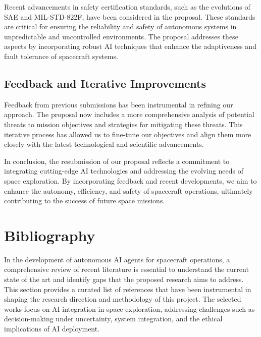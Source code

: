 \documentclass[a4paper, 11pt]{article}
\begin{document}
Recent advancements in safety certification standards, such as the evolutions of SAE and MIL-STD-822F, have been considered in the proposal. These standards are critical for ensuring the reliability and safety of autonomous systems in unpredictable and uncontrolled environments. The proposal addresses these aspects by incorporating robust AI techniques that enhance the adaptiveness and fault tolerance of spacecraft systems.

\subsection{Feedback and Iterative Improvements}

Feedback from previous submissions has been instrumental in refining our approach. The proposal now includes a more comprehensive analysis of potential threats to mission objectives and strategies for mitigating these threats. This iterative process has allowed us to fine-tune our objectives and align them more closely with the latest technological and scientific advancements.

In conclusion, the resubmission of our proposal reflects a commitment to integrating cutting-edge AI technologies and addressing the evolving needs of space exploration. By incorporating feedback and recent developments, we aim to enhance the autonomy, efficiency, and safety of spacecraft operations, ultimately contributing to the success of future space missions.
\section{Bibliography}

In the development of autonomous AI agents for spacecraft operations, a comprehensive review of recent literature is essential to understand the current state of the art and identify gaps that the proposed research aims to address. This section provides a curated list of references that have been instrumental in shaping the research direction and methodology of this project. The selected works focus on AI integration in space exploration, addressing challenges such as decision-making under uncertainty, system integration, and the ethical implications of AI deployment.
\end{document}
